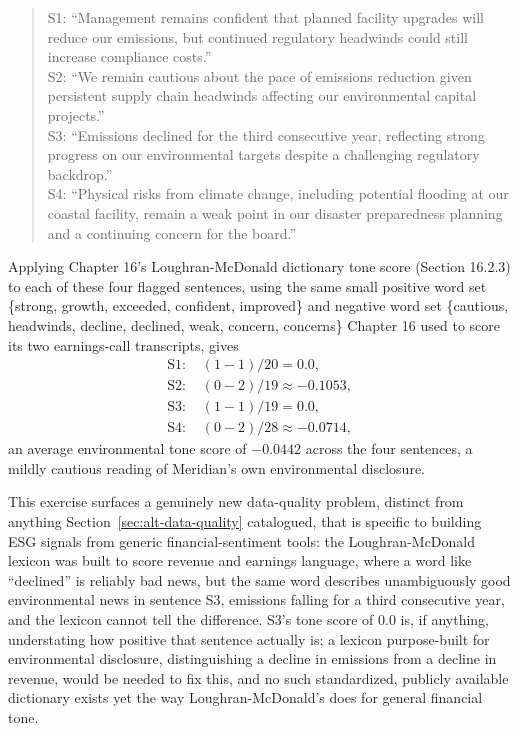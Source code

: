 \documentclass[../ai_in_finance]{subfiles}
\begin{document}
\begin{quote}
\small
S1: ``Management remains confident that planned facility upgrades will reduce our emissions, but continued regulatory headwinds could still increase compliance costs.''\\
S2: ``We remain cautious about the pace of emissions reduction given persistent supply chain headwinds affecting our environmental capital projects.''\\
S3: ``Emissions declined for the third consecutive year, reflecting strong progress on our environmental targets despite a challenging regulatory backdrop.''\\
S4: ``Physical risks from climate change, including potential flooding at our coastal facility, remain a weak point in our disaster preparedness planning and a continuing concern for the board.''
\end{quote}

Applying Chapter 16's Loughran-McDonald dictionary tone score (Section 16.2.3) to each of these four flagged sentences, using the same small positive word set \{strong, growth, exceeded, confident, improved\} and negative word set \{cautious, headwinds, decline, declined, weak, concern, concerns\} Chapter 16 used to score its two earnings-call transcripts, gives
\begin{align*}
\text{S1: } & (1-1)/20 = 0.0, \\
\text{S2: } & (0-2)/19 \approx -0.1053, \\
\text{S3: } & (1-1)/19 = 0.0, \\
\text{S4: } & (0-2)/28 \approx -0.0714,
\end{align*}
an average environmental tone score of $-0.0442$ across the four sentences, a mildly cautious reading of Meridian's own environmental disclosure.

This exercise surfaces a genuinely new data-quality problem, distinct from anything Section~\ref{sec:alt-data-quality} catalogued, that is specific to building ESG signals from generic financial-sentiment tools: the Loughran-McDonald lexicon was built to score revenue and earnings language, where a word like ``declined'' is reliably bad news, but the same word describes unambiguously good environmental news in sentence S3, emissions falling for a third consecutive year, and the lexicon cannot tell the difference. S3's tone score of $0.0$ is, if anything, understating how positive that sentence actually is; a lexicon purpose-built for environmental disclosure, distinguishing a decline in emissions from a decline in revenue, would be needed to fix this, and no such standardized, publicly available dictionary exists yet the way Loughran-McDonald's does for general financial tone.
\end{document}
